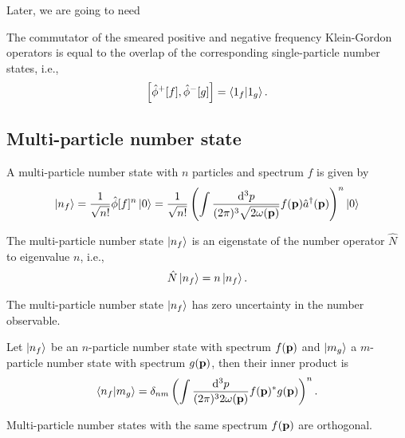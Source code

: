 Later, we are going to need
\begin{lemma}\label{thm:single_partiicle_number_state_inner_product_pn_smeared_kg_comm}
	The commutator of the smeared positive and negative frequency Klein-Gordon operators is equal to the overlap of the corresponding single-particle number states, i.e.,
	\begin{equation}
		\comm{\hat\phi^+[f]}{\hat\phi^-[g]}
		=
		\braket{1_f}{1_g}
		.
	\end{equation}
\end{lemma}

\subsection{Multi-particle number state}

\begin{definition}
	A multi-particle number state with $n$ particles and spectrum $f$ is given by
	\begin{equation}
		\ket{n_f}
		=
		\frac{1}{\sqrt{n!}}
		\hat\phi[f]^n
		\ket{0}
		=
		\frac{1}{\sqrt{n!}}
		\left(
			\int\frac{\dd[3]{p}}{(2\pi)^3\sqrt{2\omega(\vb{p})}}
			f(\vb{p})
			\hat{a}^\dagger(\vb{p})
		\right)^n
		\ket{0}
	\end{equation}
\end{definition}
\begin{theorem}
	The multi-particle number state $\ket{n_f}$ is an eigenstate of the number operator $\hat{N}$ to eigenvalue $n$, i.e.,
	\begin{equation}
		\hat{N}
		\ket{n_f}
		=
		n
		\ket{n_f}
		.
	\end{equation}
\end{theorem}
\begin{corollary}
	The multi-particle number state $\ket{n_f}$ has zero uncertainty in the number observable.
\end{corollary}
\begin{theorem}\label{thm:multi_particle_number_state_inner_product}
	Let $\ket{n_f}$ be an $n$-particle number state with spectrum $f(\vb{p})$ and $\ket{m_g}$ a $m$-particle number state with spectrum $g(\vb{p})$, then their inner product is
	\begin{equation}
		\braket{n_f}{m_g}
		=
		\delta_{nm}
		\left(
			\int\frac{\dd[3]{p}}{(2\pi)^32\omega(\vb{p})}
			f(\vb{p})^*
			g(\vb{p})
		\right)^n
		.
	\end{equation}
\end{theorem}
\begin{corollary}
	Multi-particle number states with the same spectrum $f(\vb{p})$ are orthogonal.
\end{corollary}

